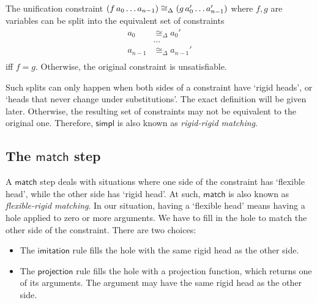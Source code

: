 \documentclass[twoside]{report}
\begin{document}
\begin{example}
    The unification constraint $({{{f}\,{a_0}}\,{\ldots}}\,{a_{n-1}}) \cong_\Delta ({{{g}\,{a_0'}}\,{\ldots}}\,{a_{n-1}'})$ where $f, g$ are variables can be split into the equivalent set of constraints
    $$
        \begin{aligned}
            a_0     & \cong_\Delta a_0'     \\
                    & \ldots                \\
            a_{n-1} & \cong_\Delta a_{n-1}' \\
        \end{aligned}
    $$
    iff $f = g$. Otherwise, the original constraint is unsatisfiable.
\end{example}

Such splits can only happen when both sides of a constraint have `rigid heads', or `heads that never change under substitutions'. The exact definition will be given later. Otherwise, the resulting set of constraints may not be equivalent to the original one. Therefore, $\mathsf{simpl}$ is also known as \emph{rigid-rigid matching}.

\subsection*{The $\mathsf{match}$ step}

A $\mathsf{match}$ step deals with situations where one side of the constraint has `flexible head', while the other side has `rigid head'. At such, $\mathsf{match}$ is also known as \emph{flexible-rigid matching}. In our situation, having a `flexible head' means having a hole applied to zero or more arguments. We have to fill in the hole to match the other side of the constraint. There are two choices:

\begin{itemize}[noitemsep]
    \item The $\mathsf{imitation}$ rule fills the hole with the same rigid head as the other side.
    \item The $\mathsf{projection}$ rule fills the hole with a projection function, which returns one of its arguments. The argument may have the same rigid head as the other side.
\end{itemize}
\end{document}
